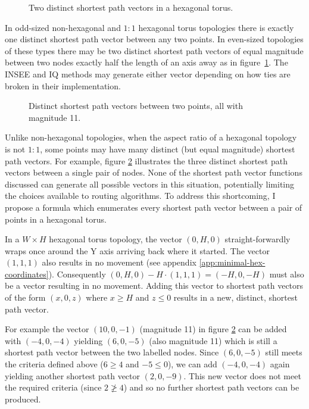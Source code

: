			\begin{figure}
				\center
				
				\caption{Two distinct shortest path vectors in a hexagonal torus.}
				\label{fig:wrap-alternatives}
			\end{figure}
			
			In odd-sized non-hexagonal and $1:1$ hexagonal torus topologies there is
			exactly one distinct shortest path vector between any two points. In
			even-sized topologies of these types there may be two distinct shortest
			path vectors of equal magnitude between two nodes exactly half the length
			of an axis away as in figure~\ref{fig:wrap-alternatives}. The INSEE and
			IQ methods may generate either vector depending on how ties are broken in
			their implementation.
			
			\begin{figure}
				\center
				
				\caption{Distinct shortest path vectors between two points, all with
				magnitude 11.}
				\label{fig:spiralling}
			\end{figure}
			
			Unlike non-hexagonal topologies, when the aspect ratio of a hexagonal
			topology is not $1:1$, some points may have many distinct (but equal
			magnitude) shortest path vectors.  For example, figure
			\ref{fig:spiralling} illustrates the three distinct shortest path vectors
			between a single pair of nodes. None of the shortest path vector
			functions discussed can generate all possible vectors in this situation,
			potentially limiting the choices available to routing algorithms.  To
			address this shortcoming, I propose a formula which enumerates every
			shortest path vector between a pair of points in a hexagonal torus.
			
			In a $W \times H$ hexagonal torus topology, the vector $(0, H, 0)$
			straight-forwardly wraps once around the Y axis arriving back where it
			started. The vector $(1,1,1)$ also results in no movement (see appendix
			\ref{app:minimal-hex-coordinates}).  Consequently $(0,H,0) -
			H\cdot(1,1,1) = (-H, 0, -H)$ must also be a vector resulting in no
			movement.  Adding this vector to shortest path vectors of the form $(x,
			0, z)$ where $x\ge H$ and $z\le0$ results in a new, distinct, shortest
			path vector.
			
			For example the vector $(10, 0, -1)$ (magnitude 11) in figure
			\ref{fig:spiralling} can be added with $(-4, 0, -4)$ yielding $(6, 0,
			-5)$ (also magnitude 11) which is still a shortest path vector between
			the two labelled nodes.  Since $(6, 0, -5)$ still meets the criteria
			defined above ($6 \ge 4$ and $-5 \le 0$), we can add $(-4, 0, -4)$ again
			yielding another shortest path vector $(2, 0, -9)$.  This new vector does
			not meet the required criteria (since $2 \ngeq 4$) and so no further
			shortest path vectors can be produced.
			
